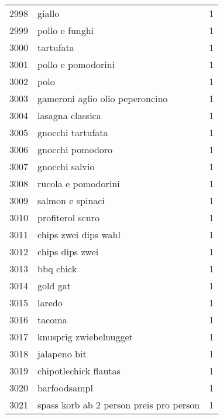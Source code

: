 \begin{tabular}{llr}
2998 &                                             giallo &      1 \\
2999 &                                     pollo e funghi &      1 \\
3000 &                                          tartufata &      1 \\
3001 &                                 pollo e pomodorini &      1 \\
3002 &                                               polo &      1 \\
3003 &                    gameroni aglio olio peperoncino &      1 \\
3004 &                                   lasagna classica &      1 \\
3005 &                                  gnocchi tartufata &      1 \\
3006 &                                   gnocchi pomodoro &      1 \\
3007 &                                     gnocchi salvio &      1 \\
3008 &                                rucola e pomodorini &      1 \\
3009 &                                   salmon e spinaci &      1 \\
3010 &                                   profiterol scuro &      1 \\
3011 &                               chips zwei dips wahl &      1 \\
3012 &                                    chips dips zwei &      1 \\
3013 &                                          bbq chick &      1 \\
3014 &                                           gold gat &      1 \\
3015 &                                             laredo &      1 \\
3016 &                                             tacoma &      1 \\
3017 &                             knusprig zwiebelnugget &      1 \\
3018 &                                       jalapeno bit &      1 \\
3019 &                              chipotlechick flautas &      1 \\
3020 &                                       barfoodsampl &      1 \\
3021 &            spass korb ab 2 person preis pro person &      1 \\

\end{tabular}
